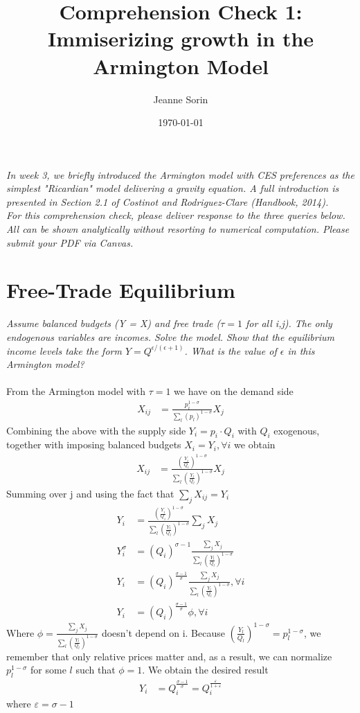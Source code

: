 \documentclass[10pt, final]{article}
\title{Comprehension Check 1: Immiserizing growth in the Armington Model}
\author{Jeanne Sorin}
\date{\today}
\def\e{\varepsilon}
\def\s{\sigma}
\begin{document}
\maketitle

\textit{In week 3, we briefly introduced the Armington model with CES preferences as the simplest "Ricardian" model delivering a gravity equation. A full introduction is presented in Section 2.1 of Costinot and Rodriguez-Clare (Handbook, 2014). 
\\
For this comprehension check, please deliver response to the three queries below. All can be shown analytically without resorting to numerical computation. Please submit your PDF via Canvas.}

\section{Free-Trade Equilibrium} %
\label{sec:free_trade_equilibrium}

\textit{Assume balanced budgets (Y = X) and free trade ($\tau=1$ for all i,j). The only endogenous variables are incomes. Solve the model. Show that the equilibrium income levels take the form $Y = Q^{\epsilon /(\epsilon+1)}$. What is the value of $\epsilon$ in this Armington model?}
\\
\\
From the Armington model with $\tau = 1$ we have on the demand side
\begin{align*}
	X_{ij} &= \frac{p_i^{1-\s}}{\sum_l (p_l)^{1-\s}} X_j
\end{align*}
Combining the above with the supply side $Y_i = p_i \cdot Q_i$ with $Q_i$ exogenous, together with imposing balanced budgets $X_i = Y_i, \forall i$ we obtain
\begin{align*}
	X_{ij} &= \frac{(\frac{Y_i}{Q_i})^{1-\s}}{\sum_l (\frac{Y_l}{Q_l})^{1-\s}} X_j
\end{align*}
Summing over j and using the fact that $\sum_j X_{ij} = Y_i$
\begin{align*}
	Y_i &= \frac{(\frac{Y_i}{Q_i})^{1-\s}}{\sum_l (\frac{Y_l}{Q_l})^{1-\s}} \sum_j X_j \\
	Y_i^{\s} &= (Q_i)^{\s-1}\frac{\sum_j X_j}{\sum_l (\frac{Y_l}{Q_l})^{1-\s}}  \\
	Y_i &= (Q_i)^{\frac{\s-1}{\s}}\frac{\sum_j X_j}{\sum_l (\frac{Y_l}{Q_l})^{1-\s}}, \forall i \\
	Y_i &= (Q_i)^{\frac{\s-1}{\s}} \phi, \forall i 
\end{align*}
Where $\phi = \frac{\sum_j X_j}{\sum_l (\frac{Y_l}{Q_l})^{1-\s}}$ doesn't depend on i. Because $(\frac{Y_l}{Q_l})^{1-\s} = p_l^{1-\s}$, we remember that only relative prices matter and, as a result, we can normalize $p_l^{1-\s}$ for some $l$ such that $\phi = 1$. We obtain the desired result
\begin{align*}
	Y_i &= Q_i^{\frac{\s-1}{\s}} = Q_i^{\frac{\e}{1+\e}}
\end{align*}
where $\e = \s - 1$
\end{document}
